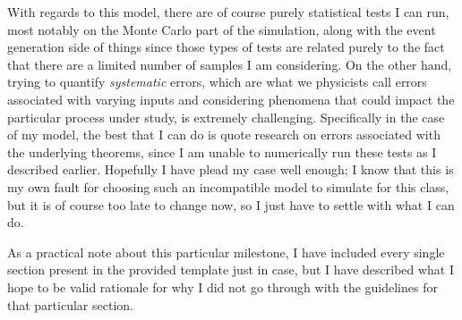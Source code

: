 With regards to this model, there are of course purely statistical tests I can run, most notably on the Monte Carlo part of the simulation, along with the event generation side of things since those types of tests are related purely to the fact that there are a limited number of samples I am considering. On the other hand, trying to quantify \textit{systematic} errors, which are what we physicists call errors associated with varying inputs and considering phenomena that could impact the particular process under study, is extremely challenging. Specifically in the case of my model, the best that I can do is quote research on errors associated with the underlying theorems, since I am unable to numerically run these tests as I described earlier. Hopefully I have plead my case well enough; I know that this is my own fault for choosing such an incompatible model to simulate for this class, but it is of course too late to change now, so I just have to settle with what I can do.

As a practical note about this particular milestone, I have included every single section present in the provided template just in case, but I have described what I hope to be valid rationale for why I did not go through with the guidelines for that particular section.


